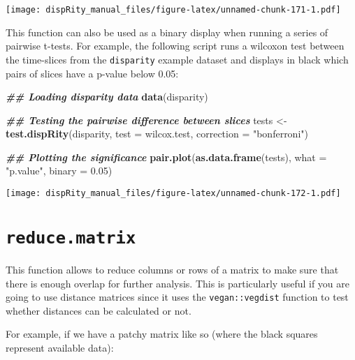 \documentclass[
]{book}
\newenvironment{Shaded}{\begin{snugshade}}{\end{snugshade}}
\newcommand{\AttributeTok}[1]{\textcolor[rgb]{0.13,0.29,0.53}{#1}}
\newcommand{\DocumentationTok}[1]{\textcolor[rgb]{0.56,0.35,0.01}{\textbf{\textit{#1}}}}
\newcommand{\FloatTok}[1]{\textcolor[rgb]{0.00,0.00,0.81}{#1}}
\newcommand{\FunctionTok}[1]{\textcolor[rgb]{0.13,0.29,0.53}{\textbf{#1}}}
\newcommand{\NormalTok}[1]{#1}
\newcommand{\OtherTok}[1]{\textcolor[rgb]{0.56,0.35,0.01}{#1}}
\newcommand{\StringTok}[1]{\textcolor[rgb]{0.31,0.60,0.02}{#1}}
\begin{document}
\texttt{[image: dispRity\_manual\_files/figure-latex/unnamed-chunk-171-1.pdf]}

This function can also be used as a binary display when running a series of pairwise t-tests.
For example, the following script runs a wilcoxon test between the time-slices from the \texttt{disparity} example dataset and displays in black which pairs of slices have a p-value below 0.05:

\begin{Shaded}
\begin{Highlighting}[]
\DocumentationTok{\#\# Loading disparity data}
\FunctionTok{data}\NormalTok{(disparity)}

\DocumentationTok{\#\# Testing the pairwise difference between slices}
\NormalTok{tests }\OtherTok{\textless{}{-}} \FunctionTok{test.dispRity}\NormalTok{(disparity, }\AttributeTok{test =}\NormalTok{ wilcox.test, }\AttributeTok{correction =} \StringTok{"bonferroni"}\NormalTok{)}

\DocumentationTok{\#\# Plotting the significance}
\FunctionTok{pair.plot}\NormalTok{(}\FunctionTok{as.data.frame}\NormalTok{(tests), }\AttributeTok{what =} \StringTok{"p.value"}\NormalTok{, }\AttributeTok{binary =} \FloatTok{0.05}\NormalTok{)}
\end{Highlighting}
\end{Shaded}

\texttt{[image: dispRity\_manual\_files/figure-latex/unnamed-chunk-172-1.pdf]}

\hypertarget{reduce.matrix}{%
\section{\texorpdfstring{\texttt{reduce.matrix}}{reduce.matrix}}\label{reduce.matrix}}

This function allows to reduce columns or rows of a matrix to make sure that there is enough overlap for further analysis.
This is particularly useful if you are going to use distance matrices since it uses the \texttt{vegan::vegdist} function to test whether distances can be calculated or not.

For example, if we have a patchy matrix like so (where the black squares represent available data):
\end{document}
